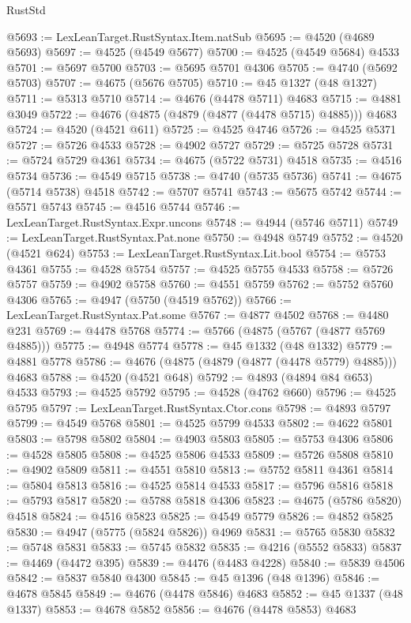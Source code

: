 \begin{lexlean}{RustStd}
\begin{coremodule}
{\begin{coremodule}
{{{{{{{{{{{{{{{{{{{{{{{{{{{{{{{{{{{{{{{{{{{{{{{{{{{{{{{{{{{{@5693 := LexLeanTarget.RustSyntax.Item.natSub
@5695 := @4520 (@4689 @5693)
@5697 := @4525 (@4549 @5677)
@5700 := @4525 (@4549 @5684) @4533
@5701 := @5697 @5700
@5703 := @5695 @5701 @4306
@5705 := @4740 (@5692 @5703)
@5707 := @4675 (@5676 @5705)
@5710 := @45 @1327 (@48 @1327)
@5711 := @5313 @5710
@5714 := @4676 (@4478 @5711) @4683
@5715 := @4881 @3049
@5722 := @4676 (@4875 (@4879 (@4877 (@4478 @5715) @4885))) @4683
@5724 := @4520 (@4521 @611)
@5725 := @4525 @4746
@5726 := @4525 @5371
@5727 := @5726 @4533
@5728 := @4902 @5727
@5729 := @5725 @5728
@5731 := @5724 @5729 @4361
@5734 := @4675 (@5722 @5731) @4518
@5735 := @4516 @5734
@5736 := @4549 @5715
@5738 := @4740 (@5735 @5736)
@5741 := @4675 (@5714 @5738) @4518
@5742 := @5707 @5741
@5743 := @5675 @5742
@5744 := @5571 @5743
@5745 := @4516 @5744
@5746 := LexLeanTarget.RustSyntax.Expr.uncons
@5748 := @4944 (@5746 @5711)
@5749 := LexLeanTarget.RustSyntax.Pat.none
@5750 := @4948 @5749
@5752 := @4520 (@4521 @624)
@5753 := LexLeanTarget.RustSyntax.Lit.bool
@5754 := @5753 @4361
@5755 := @4528 @5754
@5757 := @4525 @5755 @4533
@5758 := @5726 @5757
@5759 := @4902 @5758
@5760 := @4551 @5759
@5762 := @5752 @5760 @4306
@5765 := @4947 (@5750 (@4519 @5762))
@5766 := LexLeanTarget.RustSyntax.Pat.some
@5767 := @4877 @4502
@5768 := @4480 @231
@5769 := @4478 @5768
@5774 := @5766 (@4875 (@5767 (@4877 @5769 @4885)))
@5775 := @4948 @5774
@5778 := @45 @1332 (@48 @1332)
@5779 := @4881 @5778
@5786 := @4676 (@4875 (@4879 (@4877 (@4478 @5779) @4885))) @4683
@5788 := @4520 (@4521 @648)
@5792 := @4893 (@4894 @84 @653) @4533
@5793 := @4525 @5792
@5795 := @4528 (@4762 @660)
@5796 := @4525 @5795
@5797 := LexLeanTarget.RustSyntax.Ctor.cons
@5798 := @4893 @5797
@5799 := @4549 @5768
@5801 := @4525 @5799 @4533
@5802 := @4622 @5801
@5803 := @5798 @5802
@5804 := @4903 @5803
@5805 := @5753 @4306
@5806 := @4528 @5805
@5808 := @4525 @5806 @4533
@5809 := @5726 @5808
@5810 := @4902 @5809
@5811 := @4551 @5810
@5813 := @5752 @5811 @4361
@5814 := @5804 @5813
@5816 := @4525 @5814 @4533
@5817 := @5796 @5816
@5818 := @5793 @5817
@5820 := @5788 @5818 @4306
@5823 := @4675 (@5786 @5820) @4518
@5824 := @4516 @5823
@5825 := @4549 @5779
@5826 := @4852 @5825
@5830 := @4947 (@5775 (@5824 @5826)) @4969
@5831 := @5765 @5830
@5832 := @5748 @5831
@5833 := @5745 @5832
@5835 := @4216 (@5552 @5833)
@5837 := @4469 (@4472 @395)
@5839 := @4476 (@4483 @4228)
@5840 := @5839 @4506
@5842 := @5837 @5840 @4300
@5845 := @45 @1396 (@48 @1396)
@5846 := @4678 @5845
@5849 := @4676 (@4478 @5846) @4683
@5852 := @45 @1337 (@48 @1337)
@5853 := @4678 @5852
@5856 := @4676 (@4478 @5853) @4683
}}}}}}}}}}}}}}}}}}}}}}}}}}}}}}}}}}}}}}}}}}}}}}}}}}}}}}}}}}}}
\end{coremodule}}
\end{coremodule}
\end{lexlean}
